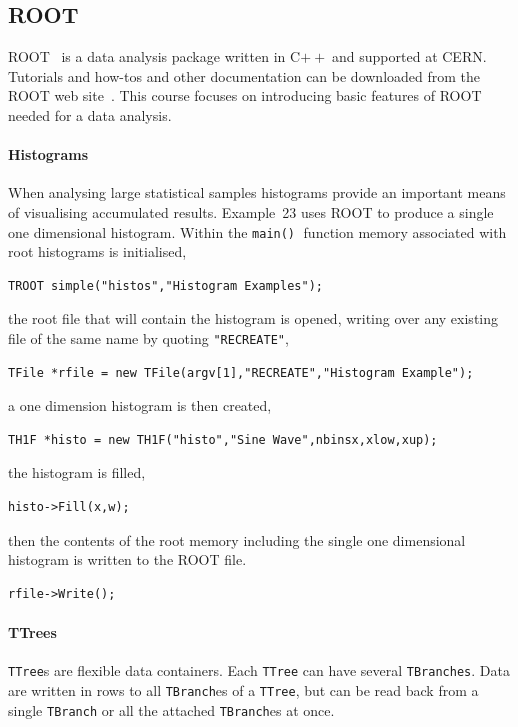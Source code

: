 \documentclass[11pt,a4paper]{scrartcl}
\def\cpp{C$++\;$}
\def\main{\texttt{main()}$\;$}
\begin{document}

\subsection{ROOT}

ROOT~\cite{rootweb} is a data analysis package written in \cpp and
supported at CERN.  Tutorials and how-tos and other documentation can
be downloaded from the ROOT web site~\cite{rootweb}.  This course
focuses on introducing basic features of ROOT needed for a data
analysis.

\paragraph{Histograms}
When analysing large statistical samples histograms provide an
important means of visualising accumulated results.  Example~23 uses
ROOT to produce a single one dimensional histogram.  Within the \main
function memory associated with root histograms is initialised,
\begin{verbatim}
TROOT simple("histos","Histogram Examples");
\end{verbatim}
the root file that will contain the histogram is opened, writing
over any existing file of the same name by quoting \texttt{"RECREATE"},
\begin{verbatim}
TFile *rfile = new TFile(argv[1],"RECREATE","Histogram Example");
\end{verbatim}
a one dimension histogram is then created,
\begin{verbatim}
TH1F *histo = new TH1F("histo","Sine Wave",nbinsx,xlow,xup);
\end{verbatim}
the histogram is filled,
\begin{verbatim}
histo->Fill(x,w);
\end{verbatim}
then the contents of the root memory including the single one
dimensional histogram is written to the ROOT file.
\begin{verbatim}
rfile->Write();
\end{verbatim}  

\paragraph{TTrees}
\texttt{TTree}s are flexible data containers.  Each \texttt{TTree}
can have several \texttt{TBranches}.  Data are written in rows to all
\texttt{TBranch}es of a \texttt{TTree}, but can be read back from a
single \texttt{TBranch} or all the attached \texttt{TBranch}es at once.
\end{document}
